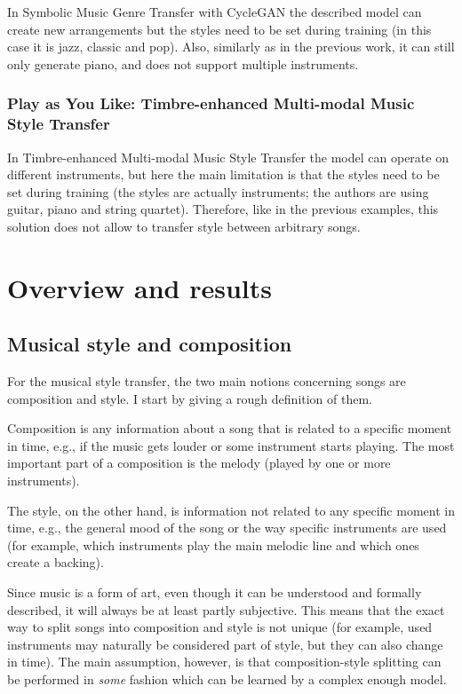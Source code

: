 \documentclass[en]{pracamgr}
\begin{document}
In Symbolic Music Genre Transfer with CycleGAN \cite{cyclegan} the described model can create new arrangements but the styles need to be set during training (in this case it is jazz, classic and pop).
Also, similarly as in the previous work, it can still only generate piano, and does not support multiple instruments.

\subsection{Play as You Like: Timbre-enhanced Multi-modal Music Style Transfer}

In Timbre-enhanced Multi-modal Music Style Transfer \cite{multimodal} the model can operate on different instruments, but here the main limitation is that the styles need to be set during training (the styles are actually instruments; the authors are using guitar, piano and string quartet).
Therefore, like in the previous examples, this solution does not allow to transfer style between arbitrary songs.

\chapter{Overview and results}

\section{Musical style and composition}

For the musical style transfer, the two main notions concerning songs are composition and style.
I start by giving a rough definition of them.

Composition is any information about a song that is related to a specific moment in time, e.g., if the music gets louder or some instrument starts playing.
The most important part of a composition is the melody (played by one or more instruments).

The style, on the other hand, is information not related to any specific moment in time, e.g., the general mood of the song or the way specific instruments are used (for example, which instruments play the main melodic line and which ones create a backing).

Since music is a form of art, even though it can be understood and formally described, it will always be at least partly subjective.
This means that the exact way to split songs into composition and style is not unique (for example, used instruments may naturally be considered part of style, but they can also change in time).
The main assumption, however, is that composition-style splitting can be performed in \emph{some} fashion which can be learned by a complex enough model.
\end{document}

